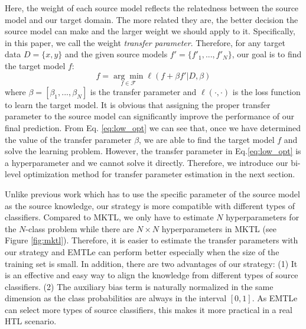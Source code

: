 Here, the weight of each source model reflects the relatedness between the source model and our target domain. The more related they are, the better decision the source model can make and the larger weight we should apply to it. Specifically, in this paper, we call the weight \textit{transfer parameter}. Therefore, for any target data $D=\{x,y\}$ and the given source models $f'=\{f'_1,...,f'_N\}$, our goal is to find the target model $f$:
\begin{equation}\label{eq:low_opt}
f=\underset{f \in \mathcal{F}}{\arg \min}\ell\left(f+\beta f'|D,\beta\right)
\end{equation} 
where $\beta=[\beta_1,...,\beta_N]$ is the transfer parameter and $\ell(\cdot,\cdot)$ is the loss function to learn the target model.
It is obvious that assigning the proper transfer parameter to the source model can significantly improve the performance of our final prediction.
From Eq. \eqref{eq:low_opt} we can see that, once we have determined the value of the transfer parameter $\beta$, we are able to find the target model $f$ and solve the learning problem.
However, the transfer parameter in Eq.\eqref{eq:low_opt} is a hyperparameter and we cannot solve it directly. Therefore, we introduce our bi-level optimization method for transfer parameter estimation in the next section.

Unlike previous work\cite{aytar2011tabula,tommasi2014learning,yang2007adapting} which has to use the specific parameter of the source model as the source knowledge, our strategy is more compatible with different types of classifiers. Compared to MKTL\cite{jie2011multiclass}, we only have to estimate $N$ hyperparameters for the $N$-class problem while there are \mbox{$N\times N$} hyperparameters in MKTL (see Figure \ref{fig:mktl}). Therefore, it is easier to estimate the transfer parameters with our strategy and EMTLe can perform better especially when the size of the training set is small.
In addition, there are two advantages of our strategy: (1) It is an effective and easy way to align the knowledge from different types of source classifiers.
(2) The auxiliary bias term is naturally normalized in the same dimension as the class probabilities are always in the interval $[0,1]$.  As EMTLe can select more types of source classifiers, this makes it more practical in a real HTL scenario.

